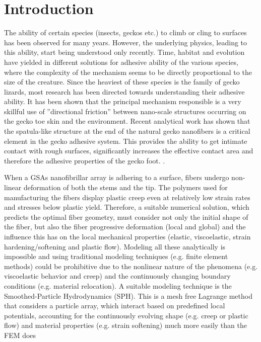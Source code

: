 \section{Introduction}
\label{intro}

The ability of certain species (insects, geckos etc.) to climb or cling to surfaces has been observed for many years. However, the underlying physics, leading to this ability, start being understood only recently. Time, habitat and evolution have yielded in different solutions for adhesive ability of the various species, where the complexity of the mechanism seems to be directly proportional to the size of the creature. Since the heaviest of these species is the family of gecko lizards, most research has been directed towards understanding their adhesive ability. It has been shown that the principal mechanism responsible is a very skillful use of ''directional friction'' between nano-scale structures occurring on the gecko toe skin and the environment. Recent analytical work has shown that the spatula-like structure at the end of the natural gecko nanofibers is a critical element in the gecko adhesive system. This provides the ability to get intimate contact with rough surfaces, significantly increases the effective contact area and therefore the adhesive properties of the gecko foot. \cite{ma1995contact, kosaka1992fast, stone2004application}. 

When a GSAs nanofibrillar array is adhering to a surface, fibers undergo non-linear deformation of both the stems and the tip. The polymers used for manufacturing the fibers display plastic creep even at relatively low strain rates and stresses below plastic yield. Therefore, a suitable numerical solution, which predicts the optimal fiber geometry, must consider not only the initial shape of the fiber, but also the fiber progressive deformation (local and global) and the influence this has on the local mechanical properties (elastic, viscoelastic, strain hardening/softening and plastic flow). Modeling all these analytically is impossible and using traditional modeling techniques (e.g. finite element methods) could be prohibitive due to the nonlinear nature of the phenomena (e.g. viscoelastic behavior and creep) and the continuously changing boundary conditions (e.g. material relocation). A suitable modeling technique is the Smoothed-Particle Hydrodynamics (SPH). This is a mesh free Lagrange method that considers a particle array, which interact based on predefined local potentials, accounting for the continuously evolving shape (e.g. creep or plastic flow) and material properties (e.g. strain softening) much more easily than the FEM does 

